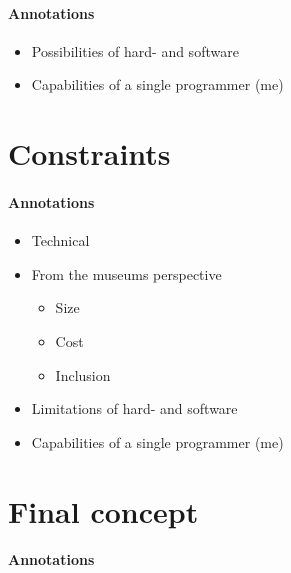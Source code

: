 \paragraph{Annotations}

\begin{itemize}
	\item Possibilities of hard- and software
	\item Capabilities of a single programmer (me)
\end{itemize}


\section{Constraints}
\label{conception_constraints}

\paragraph{Annotations}

\begin{itemize}
	\item Technical
	\item From the museums perspective
	\begin{itemize}
		\item Size
		\item Cost
		\item Inclusion
	\end{itemize}
	\item Limitations of hard- and software
	\item Capabilities of a single programmer (me)
\end{itemize}


\section{Final concept}
\label{conception_final}

\paragraph{Annotations}

